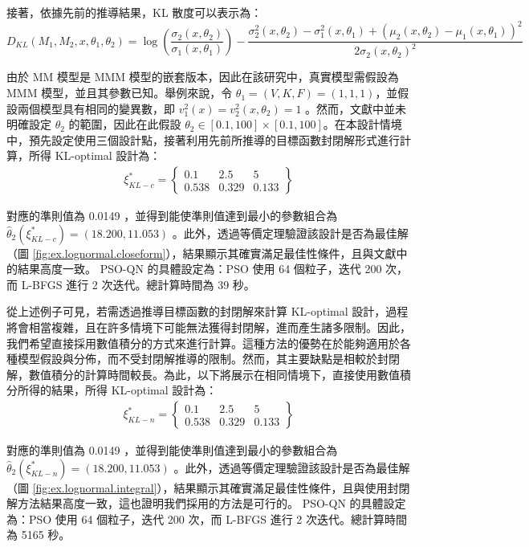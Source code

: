 接著，依據先前的推導結果，KL 散度可以表示為：
{\small
\begin{equation}
D_{KL}(M_1,M_2,x,\theta_1,\theta_2)=\log \left(\frac{\sigma_2(x,\theta_2)}{\sigma_1(x,\theta_1)}\right)-\frac{\sigma_2^2(x,\theta_2)-\sigma_1^2(x,\theta_1)+\left(\mu_2(x,\theta_2)-\mu_1(x,\theta_1)\right)^2}{2\sigma_2(x,\theta_2)^2}
\end{equation}
}

\hspace*{8mm} 由於 MM 模型是 MMM 模型的嵌套版本，因此在該研究中，真實模型需假設為 MMM 模型，並且其參數已知。舉例來說，令 $\theta_1=(V,K,F)=(1,1,1)$，並假設兩個模型具有相同的變異數，即 $v^2_1(x)=v^2_2(x,\theta_2)=1$ 。然而，文獻中並未明確設定 $\theta_2$ 的範圍，因此在此假設 $\theta_2 \in [0.1,100] \times [0.1,100]$。在本設計情境中，預先設定使用三個設計點，接著利用先前所推導的目標函數封閉解形式進行計算，所得 KL-optimal 設計為：
\begin{align*}
\xi^*_{KL-c} = \left\{\begin{array}{ccc}
0.1 & 2.5 & 5 \\
0.538 & 0.329 & 0.133
\end{array}\right\}
\end{align*}

\hspace*{8mm} 對應的準則值為 0.0149 ，並得到能使準則值達到最小的參數組合為 $\hat{\theta}_2(\xi^*_{KL-c})=(18.200,11.053)$ 。此外，透過等價定理驗證該設計是否為最佳解（圖 \ref{fig:ex.lognormal.closeform}），結果顯示其確實滿足最佳性條件，且與文獻中的結果高度一致。 PSO-QN \citep{chen2020hybrid} 的具體設定為：PSO 使用 64 個粒子，迭代 200 次，而 L-BFGS 進行 2 次迭代。總計算時間為 39 秒。

\hspace*{8mm} 從上述例子可見，若需透過推導目標函數的封閉解來計算 KL-optimal 設計，過程將會相當複雜，且在許多情境下可能無法獲得封閉解，進而產生諸多限制。因此，我們希望直接採用數值積分的方式來進行計算。這種方法的優勢在於能夠適用於各種模型假設與分佈，而不受封閉解推導的限制。然而，其主要缺點是相較於封閉解，數值積分的計算時間較長。為此，以下將展示在相同情境下，直接使用數值積分所得的結果，所得 KL-optimal 設計為：
\begin{align*}
\xi^*_{KL-n} = \left\{\begin{array}{ccc}
0.1 & 2.5 & 5 \\
0.538 & 0.329 & 0.133
\end{array}\right\}
\end{align*}

\hspace*{8mm} 對應的準則值為 0.0149 ，並得到能使準則值達到最小的參數組合為 $\hat{\theta}_2(\xi^*_{KL-n})=(18.200,11.053)$ 。此外，透過等價定理驗證該設計是否為最佳解（圖 \ref{fig:ex.lognormal.integral}），結果顯示其確實滿足最佳性條件，且與使用封閉解方法結果高度一致，這也證明我們採用的方法是可行的。 PSO-QN 的具體設定為：PSO 使用 64 個粒子，迭代 200 次，而 L-BFGS 進行 2 次迭代。總計算時間為 5165 秒。

